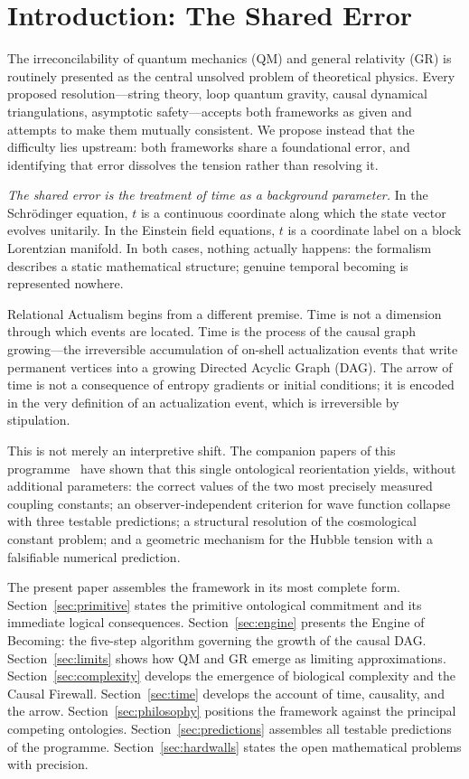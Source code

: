 \documentclass[11pt,twocolumn]{article}
\theoremstyle{plain}
\theoremstyle{remark}
\begin{document}
\section{Introduction: The Shared Error}

The irreconcilability of quantum mechanics (QM) and general relativity
(GR) is routinely presented as the central unsolved problem of
theoretical physics.
Every proposed resolution---string theory, loop quantum gravity,
causal dynamical triangulations, asymptotic safety---accepts both
frameworks as given and attempts to make them mutually consistent.
We propose instead that the difficulty lies upstream: both frameworks
share a foundational error, and identifying that error dissolves the
tension rather than resolving it.

\emph{The shared error is the treatment of time as a background parameter.}
In the Schr\"{o}dinger equation, $t$ is a continuous coordinate along
which the state vector evolves unitarily.
In the Einstein field equations, $t$ is a coordinate label on a
block Lorentzian manifold.
In both cases, nothing actually happens: the formalism describes a
static mathematical structure; genuine temporal becoming is represented
nowhere.

Relational Actualism begins from a different premise.
Time is not a dimension through which events are located.
Time is the process of the causal graph growing---the irreversible
accumulation of on-shell actualization events that write permanent
vertices into a growing Directed Acyclic Graph (DAG).
The arrow of time is not a consequence of entropy gradients or
initial conditions; it is encoded in the very definition of an
actualization event, which is irreversible by stipulation.

This is not merely an interpretive shift.
The companion papers of this programme~\cite{Sandeman2026P1,Sandeman2026P2,Sandeman2026P3}
have shown that this single ontological reorientation yields, without
additional parameters: the correct values of the two most precisely
measured coupling constants; an observer-independent criterion for
wave function collapse with three testable predictions; a structural
resolution of the cosmological constant problem; and a geometric mechanism
for the Hubble tension with a falsifiable numerical prediction.

The present paper assembles the framework in its most complete form.
Section~\ref{sec:primitive} states the primitive ontological commitment
and its immediate logical consequences.
Section~\ref{sec:engine} presents the Engine of Becoming: the
five-step algorithm governing the growth of the causal DAG.
Section~\ref{sec:limits} shows how QM and GR emerge as limiting
approximations.
Section~\ref{sec:complexity} develops the emergence of biological
complexity and the Causal Firewall.
Section~\ref{sec:time} develops the account of time, causality, and
the arrow.
Section~\ref{sec:philosophy} positions the framework against the
principal competing ontologies.
Section~\ref{sec:predictions} assembles all testable predictions
of the programme.
Section~\ref{sec:hardwalls} states the open mathematical problems
with precision.
\end{document}
